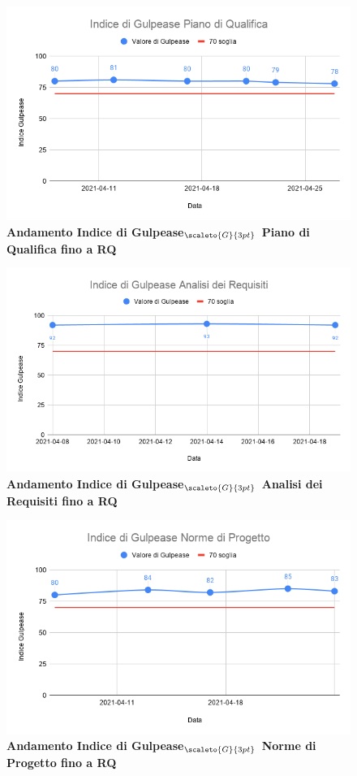 {{{{{{{{{{{{\begin{figure}[H]
	\begin{center}
		\includegraphics[width=0.8\linewidth]{../immagini/gulpeaseRQ/Indice_di_Gulpease_Piano_di_Qualifica.png}
		\caption{\textbf{Andamento Indice di Gulpease$_{\scaleto{G}{3pt}}$ Piano di Qualifica fino a RQ}}
	\end{center}
\end{figure}

\begin{figure}[H]
	\begin{center}
		\includegraphics[width=0.8\linewidth]{../immagini/gulpeaseRQ/Indice_di_Gulpease_Analisi_dei_Requisiti.png}
		\caption{\textbf{Andamento Indice di Gulpease$_{\scaleto{G}{3pt}}$ Analisi dei Requisiti fino a RQ}}
	\end{center}
\end{figure}

\begin{figure}[H]
	\begin{center}
		\includegraphics[width=0.8\linewidth]{../immagini/gulpeaseRQ/Indice_di_Gulpease_Norme_di_Progetto.png}
		\caption{\textbf{Andamento Indice di Gulpease$_{\scaleto{G}{3pt}}$ Norme di Progetto fino a RQ}}
	\end{center}
\end{figure}

}}}}}}}}}}}}
